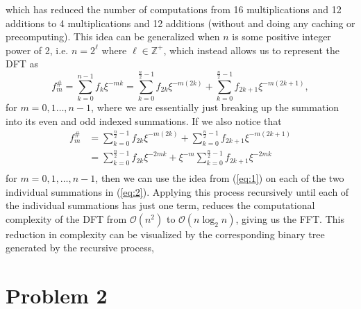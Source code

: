 \documentclass[11pt]{article}
\begin{document}
which has reduced the number of computations from 16 multiplications and 12 additions to 4 multiplications
and 12 additions (without and doing any caching or precomputing).
This idea can be generalized when $n$ is some positive integer power of 2,
i.e. $n = 2^{\ell}$ where $\ell \in \mathbb{Z}^+$, which instead allows us to represent the DFT as
\begin{equation}
	\label{eq:1}
	f_{m}^{\#} = \sum_{k=0}^{n-1}{f_k\xi^{-mk}} = \sum_{k=0}^{\frac{n}{2}-1}{f_{2k}\xi^{-m(2k)}} + \sum_{k=0}^{\frac{n}{2}-1}{f_{2k + 1}\xi^{-m(2k+1)}},
\end{equation}
for $m = 0,1\dots,n-1$, where we are essentially just breaking up the summation into its even and odd indexed
summations. If we also notice that
\begin{equation}
	\begin{aligned}
		f_{m}^{\#} &= \sum_{k=0}^{\frac{n}{2}-1}{f_{2k}\xi^{-m(2k)}} + \sum_{k=0}^{\frac{n}{2}-1}{f_{2k + 1}\xi^{-m(2k+1)}} \\
		&= \sum_{k=0}^{\frac{n}{2}-1}{f_{2k}\xi^{-2mk}} + \xi^{-m}\sum_{k=0}^{\frac{n}{2}-1}{f_{2k + 1}\xi^{-2mk}} \\
	\end{aligned}
	\label{eq:2}
\end{equation}
for $m = 0,1,\dots,n-1$, then we can use the idea from (\ref{eq:1}) on each of the two individual summations in (\ref{eq:2}).
Applying this process recursively until each of the individual summations has just one term,
reduces the computational complexity of the DFT from
$\mathcal{O}(n^2)$ to $\mathcal{O}(n\log_2{n})$, giving us the FFT.
This reduction in complexity can be visualized by the corresponding binary tree generated by the recursive process,

\newpage
\section{Problem 2}
\end{document}
